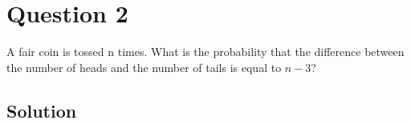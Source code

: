 \section*{Question 2}

A fair coin is tossed n times.
What is the probability that the difference between the number of heads and the number of tails is equal to \(n - 3\)?

\subsection*{Solution}
